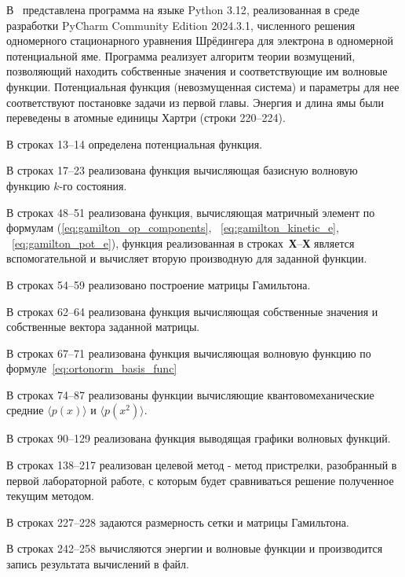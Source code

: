 В~ представлена программа на языке Python 3.12\cite{python},
реализованная в среде разработки PyCharm Community Edition 2024.3.1,
численного решения одномерного стационарного уравнения Шрёдингера для электрона в одномерной потенциальной яме.
Программа реализует алгоритм теории возмущений,
позволяющий находить собственные значения и соответствующие им волновые функции.
Потенциальная функция (невозмущенная система) и параметры для нее соответствуют постановке задачи из первой главы.
Энергия и длина ямы были переведены в атомные единицы Хартри (строки 220--224).


В строках 13--14 определена потенциальная функция.


В строках 17--23 реализована функция вычисляющая базисную волновую функцию $k$-го состояния.


В строках 48--51 реализована функция, вычисляющая матричный элемент по формулам (\ref{eq:gamilton_op_components}, ~\ref{eq:gamilton_kinetic_e}, ~\ref{eq:gamilton_pot_e}), функция реализованная в строках~\textbf{Х}--\textbf{Х} является вспомогательной и вычисляет вторую производную для заданной функции.


В строках 54--59 реализовано построение матрицы Гамильтона.


В строках 62--64 реализована функция вычисляющая собственные значения и собственные вектора заданной матрицы.


В строках 67--71 реализована функция вычисляющая волновую функцию по формуле~\eqref{eq:ortonorm_basis_func}


В строках 74--87 реализованы функции вычисляющие квантовомеханические средние $\langle p(x) \rangle$ и $\langle p(x^2) \rangle$.


В строках 90--129 реализована функция выводящая графики волновых функций.

В строках 138--217 реализован целевой метод - метод пристрелки,
разобранный в первой лабораторной работе,
с которым будет сравниваться решение полученное текущим методом.

В строках 227--228 задаются размерность сетки и матрицы Гамильтона.


В строках 242--258 вычисляются энергии и волновые функции и производится запись результата вычислений в файл.